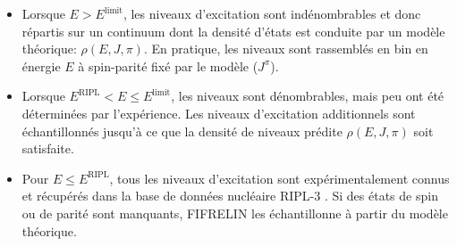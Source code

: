 
\begin{itemize}[label=\textbullet]
    \item Lorsque $E > E^\textrm{limit}$, les niveaux d'excitation sont indénombrables et donc répartis sur un continuum dont la densité d'états est conduite par un modèle théorique: $\rho(E,J, \pi)$. En pratique, les niveaux sont rassemblés en bin en énergie $E$ à spin-parité fixé par le modèle ($J^\pi$).\\
    \item Lorsque $ E^\textrm{RIPL} < E \leq E^\textrm{limit}$, les niveaux sont dénombrables, mais peu ont été déterminées par l'expérience. Les niveaux d'excitation additionnels sont échantillonnés jusqu'à ce que la densité de niveaux prédite $\rho(E,J, \pi)$ soit satisfaite.\\
    \item Pour $E \leq E^\textrm{RIPL}$, tous les niveaux d'excitation sont expérimentalement connus et récupérés dans la base de données nucléaire RIPL-3 \cite{Capote:2009qqf}. Si des états de spin ou de parité sont manquants, FIFRELIN les échantillonne à partir du modèle théorique.\\
\end{itemize}


